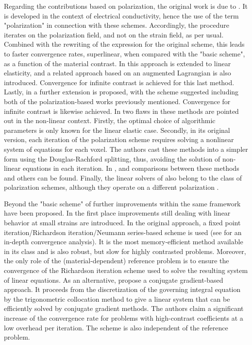 Regarding the contributions based on polarization, the original work is due to \cite{eyre_fast_1999}.
It is developed in the context of electrical conductivity, hence the use of the term "polarization" in connection with these schemes.
Accordingly, the procedure iterates on the polarization field, and not on the strain field, as per usual.
Combined with the rewriting of the expression for the original scheme, this leads to faster convergence rates, superlinear, when compared with the "basic scheme", as a function of the material contrast.
In \cite{michel_computational_2001} this approach is extended to linear elasticity, and a related approach based on an augmented Lagrangian is also introduced.
Convergence for infinite contrast is achieved for this last method.
Lastly, in \cite{monchiet_polarization-based_2012} a further extension is proposed, with the scheme suggested including both of the polarization-based works previously mentioned.
Convergence for infinite contrast is likewise achieved.
In \cite{schneider_polarization-based_2019} two flaws in these methods are pointed out in the non-linear context.
Firstly, the optimal choice of algorithmic parameters is only known for the linear elastic case.
Secondly, in its original version, each iteration of the polarization scheme requires solving a nonlinear system of equations for each voxel.
The authors cast these methods into a simpler form using the Douglas-Rachford splitting, thus, avoiding the solution of non-linear equations in each iteration.
In \cite{moulinec_comparison_2014}, \cite{moulinec_comparison_2014-1} and \cite{schneider_polarization-based_2019} comparisons between these methods and others can be found.
Finally, the linear solvers of \cite{brisard_fft-based_2010, brisard_combining_2012} also belong to the class of polarization schemes, although they operate on a different polarization \citep{schneider_lippmannschwinger_2020}.

Beyond the "basic scheme" of \cite{moulinec_fast_1994} further improvements within the same framework have been proposed.
In the first place improvements still dealing with linear behavior at small strains are introduced.
In the original approach, a fixed point iteration/Richardson iteration/Neumann series-based scheme is used (see \cite{moulinec_convergence_2018} for an in-depth convergence analysis).
It is the most memory-efficient method available in its class and is also robust, but slow for highly contrasted problems.
Moreover, the only role of the (material-dependent) reference problem is to ensure the convergence of the Richardson iteration scheme used to solve the resulting system of linear equations.
As an alternative, \cite{zeman_accelerating_2010} propose a conjugate gradient-based approach.
It proceeds from the discretization of the governing integral equation by the trigonometric collocation method to give a linear system that can be efficiently solved by conjugate gradient methods.
The authors claim a significant increase of the convergence rate for problems with high-contrast coefficients at a low overhead per iteration.
The scheme is also independent of the reference problem.

